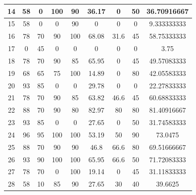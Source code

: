 \begin{table}[H]
\begin{tabular}{|c|c|c|c|c|c|c|c|c|}
14          & 58          & 0           & 100         & 90           & 36.17       & 0           & 50            & 36.70916667         \\ \hline
15          & 58          & 0           & 0           & 90           & 0           & 0           & 0             & 9.333333333         \\ \hline
16          & 78          & 70          & 90          & 100          & 68.08       & 31.6        & 45            & 58.75333333         \\ \hline
17          & 0           & 45          & 0           & 0            & 0           & 0           & 0             & 3.75                \\ \hline
18          & 78          & 70          & 90          & 85           & 65.95       & 0           & 45            & 49.57083333         \\ \hline
19          & 68          & 65          & 75          & 100          & 14.89       & 0           & 80            & 42.05583333         \\ \hline
20          & 93          & 85          & 0           & 0            & 29.78       & 0           & 0             & 22.27833333         \\ \hline
21          & 78          & 70          & 90          & 85           & 63.82       & 46.6        & 45            & 60.68833333         \\ \hline
22          & 88          & 70          & 90          & 80           & 82.97       & 80          & 80            & 81.40916667         \\ \hline
23          & 93          & 85          & 0           & 0            & 27.65       & 0           & 50            & 31.74583333         \\ \hline
24          & 96          & 95          & 100         & 100          & 53.19       & 50          & 90            & 73.0475             \\ \hline
25          & 88          & 70          & 90          & 90           & 46.8        & 66.6        & 80            & 69.51666667         \\ \hline
26          & 93          & 90          & 100         & 100          & 65.95       & 66.6        & 50            & 71.72083333         \\ \hline
27          & 78          & 70          & 0           & 100          & 19.14       & 0           & 45            & 31.11833333         \\ \hline
28          & 58          & 10          & 85          & 90           & 27.65       & 30          & 40            & 39.6625             \\ \hline

\end{tabular}
\end{table}
